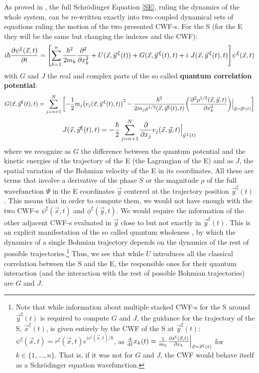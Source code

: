 \documentclass[11pt, a4paper]{article} %
\begin{document}
As proved in \cite{GJ}, the full Schrödinger Equation \eqref{SE}, ruling the dynamics of the whole system, can be re-written exactly into two coupled dynamical sets of equations ruling the motion of the two presented CWF-s. For the S (for the E they will be the same but changing the indexes and the CWF):
\begin{equation}\label{SE.GJ}
i \hbar \pdv{\psi^\xi (\vec{x},t)}{t} = \qty[\sum_{k=1}^n\frac{\hbar^2}{2m_k} \pdv[2]{}{x_k} +  U(\vec{x}, \vec{y}^{\, \xi}(t)) + G(\vec{x}, \vec{y}^{\, \xi}(t),t)+i\ J(\vec{x}, \vec{y}^{\, \xi}(t),t)] \psi^\xi (\vec{x},t)
\end{equation}
with $G$ and $J$ the real and complex parts of the so called {\bf quantum correlation potential}:
\begin{equation}\label{G.Bohm}
G(\vec{x},\vec{y}^\xi(t),t)=\sum_{j=n+1}^N\qty[-\frac{1}{2}m_j\qty(v_j(\vec{x},\vec{y}^{\, \xi}(t),t))^2-\frac{\hbar^2}{2m_j\rho^{1/2}(\vec{x},\vec{y}^\xi(t),t)}\qty(\pdv[2]{\rho^{1/2}(\vec{x},\vec{y},t)}{x_k})\Big\rvert_{\vec{y}=\vec{y}^\xi(t)} ]
\end{equation}
\begin{equation}\label{J.Bohm}
J(\vec{x},\vec{y}^\xi(t),t)=-\frac{\hbar}{2}\sum_{j=n+1}^N\pdv{}{x_j}v_j(\vec{x},\vec{y},t)\Big\rvert_{\vec{y}^{\, \xi}(t)}
\end{equation}
where we recognize as $G$ the difference between the quantum potential \cite{JordiXavier, Durr} and the kinetic energies of the trajectory of the E (the Lagrangian of the E) and as $J$, the spatial variation of the Bohmian velocity of the E in its coordinates. All these are terms that involve a derivative of the phase $S$ or the magnitude $\rho$ of the full wavefunction $\Psi$ in the E coordinates $\vec{y}$ centered at the trajectory position $\vec{y}^\xi(t)$. This means that in order to compute them, we would not have enough with the two CWF-s $\psi^\xi(\vec{x},t)$ and $\phi^\xi(\vec{y},t)$. We would require the information of the other adjacent CWF-s evaluated in $\vec{y}$ close to but not exactly in $\vec{y}^\xi(t)$. This is an explicit manifestation of the so called quantum wholeness \cite{JordiXavier}, by which the dynamics of a single Bohmian trajectory depends on the dynamics of the rest of possible trajectories.\footnote{Note that while information about multiple stacked CWF-s for the S around $\vec{y}^\xi(t)$ is required to compute $G$ and $J$, the guidance for the trajectory of the S, $\vec{x}^\xi(t)$, is given entirely by the CWF of the S at $\vec{y}^\xi(t)$: $\psi^\xi (\vec{x},t)=r^\xi(\vec{x},t)e^{is^\xi(\vec{x},t)/\hbar}$, as $\dv{}{t}x_k(t)=\frac{1}{m_k}\pdv{s^\xi(\vec{x},t)}{x_k}\Big\rvert_{\vec{x}=\vec{x}^\xi(t)}$ for $k\in\{1,...,n\}$. That is, if it was not for $G$ and $J$, the CWF would behave itself as a Schrödinger equation wavefunction.} Thus, we see that while $U$ introduces all the classical correlation between the S and the E, the responsible ones for their quantum interaction (and the interaction with the rest of possible Bohmian trajectories) are $G$ and $J$.
\end{document}
